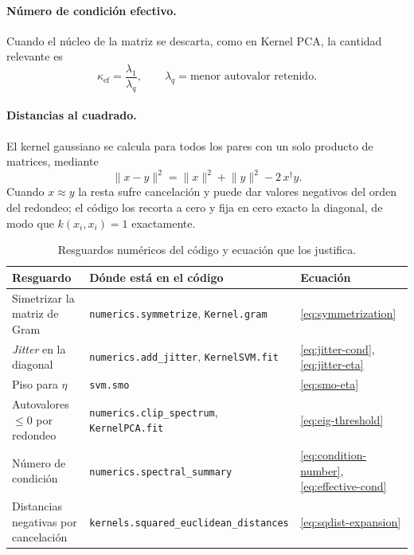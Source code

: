 \documentclass[11pt,a4paper]{article}
\newcommand{\dg}{\dagger}                         %
\newcommand{\norm}[1]{\lVert #1\rVert}
\newcommand{\code}[1]{\texttt{#1}}
\theoremstyle{plain}
\theoremstyle{definition}
\theoremstyle{remark}
\numberwithin{equation}{section}
\begin{document}
\paragraph{Número de condición efectivo.} Cuando el núcleo de la matriz se descarta, como en
Kernel PCA, la cantidad relevante es
\begin{equation}\label{eq:effective-cond}
  \kappa_{\mathrm{ef}}=\frac{\lambda_1}{\lambda_q},\qquad
  \lambda_q=\text{menor autovalor retenido} .
\end{equation}

\paragraph{Distancias al cuadrado.} El kernel gaussiano se calcula para todos los pares con
un solo producto de matrices, mediante
\begin{equation}\label{eq:sqdist-expansion}
  \norm{x-y}^2=\norm x^2+\norm y^2-2\,x^{\dg}y .
\end{equation}
Cuando $x\approx y$ la resta sufre cancelación y puede dar valores negativos del orden del
redondeo; el código los recorta a cero y fija en cero exacto la diagonal, de modo que
$k(x_i,x_i)=1$ exactamente.

\begin{table}[H]
  \centering
  \small
  \begin{tabular}{@{}lll@{}}
    \toprule
    Resguardo & Dónde está en el código & Ecuación \\
    \midrule
    Simetrizar la matriz de Gram & \code{numerics.symmetrize}, \code{Kernel.gram} & \eqref{eq:symmetrization} \\
    \emph{Jitter} en la diagonal & \code{numerics.add\_jitter}, \code{KernelSVM.fit} & \eqref{eq:jitter-cond}, \eqref{eq:jitter-eta} \\
    Piso para $\eta$ & \code{svm.smo} & \eqref{eq:smo-eta} \\
    Autovalores $\le0$ por redondeo & \code{numerics.clip\_spectrum}, \code{KernelPCA.fit} & \eqref{eq:eig-threshold} \\
    Número de condición & \code{numerics.spectral\_summary} & \eqref{eq:condition-number}, \eqref{eq:effective-cond} \\
    Distancias negativas por cancelación & \code{kernels.squared\_euclidean\_distances} & \eqref{eq:sqdist-expansion} \\
    \bottomrule
  \end{tabular}
  \caption{Resguardos numéricos del código y ecuación que los justifica.}
  \label{tab:resguardos}
\end{table}
\end{document}
